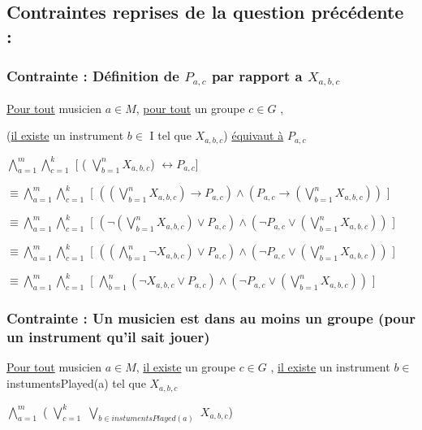 \documentclass[a4paper,10pt]{article}
\begin{document}
\subsection{Contraintes reprises de la question précédente : }
 
\subsubsection{Contrainte : Définition de $P_{a,c}$ par rapport a $X_{a,b,c}$}

\underline{Pour tout} musicien $a \in M $, \underline{pour tout} un groupe $c \in G$ , 

(\underline{il existe} un instrument $b \in$ I  tel que $X_{a,b,c}$)
\underline{équivaut à} $P_{a,c}$

$\bigwedge \limits_{a=1}^{m}  \bigwedge \limits_{c=1}^{k}$ [ ( $\bigvee \limits_{b=1}^{n}  X_{a,b,c}$) $\leftrightarrow P_{a,c}$]

$\equiv  \bigwedge \limits_{a=1}^{m}  \bigwedge \limits_{c=1}^{k}$ [ $ ( (\bigvee \limits_{b=1}^{n}  X_{a,b,c}) \rightarrow P_{a,c} ) \wedge
(P_{a,c} \rightarrow  (\bigvee \limits_{b=1}^{n}  X_{a,b,c}) )$ ]

$\equiv  \bigwedge \limits_{a=1}^{m}  \bigwedge \limits_{c=1}^{k}$ [ $ ( \neg (\bigvee \limits_{b=1}^{n}  X_{a,b,c}) \vee P_{a,c} ) \wedge
 (\neg P_{a,c} \vee  (\bigvee \limits_{b=1}^{n}  X_{a,b,c}) )$ ]
 
$\equiv  \bigwedge \limits_{a=1}^{m}  \bigwedge \limits_{c=1}^{k}$ [ $ ( ( \bigwedge \limits_{b=1}^{n}  \neg X_{a,b,c}) \vee P_{a,c} ) \wedge
 (\neg P_{a,c} \vee  (\bigvee \limits_{b=1}^{n}  X_{a,b,c}) )$ ]
 
$\equiv  \bigwedge \limits_{a=1}^{m}  \bigwedge \limits_{c=1}^{k}$ [ $ \bigwedge \limits_{b=1}^{n}  ( \neg X_{a,b,c} \vee P_{a,c} ) \wedge
 (\neg P_{a,c} \vee  (\bigvee \limits_{b=1}^{n}  X_{a,b,c}) )$ ] 

 
\subsubsection{Contrainte : Un musicien est dans au moins un groupe (pour un instrument qu'il sait jouer)}


\underline{Pour tout} musicien $a \in M $, \underline{il existe} un groupe $c \in G$ , \underline{il existe} un instrument $b \in$ instumentsPlayed(a)  tel que $X_{a,b,c}$


$\bigwedge \limits_{a=1}^{m}$ ( $\bigvee \limits_{c=1}^{k}$ $\bigvee \limits_{b \in instumentsPlayed(a) }$  $X_{a,b,c}$)
\end{document}

